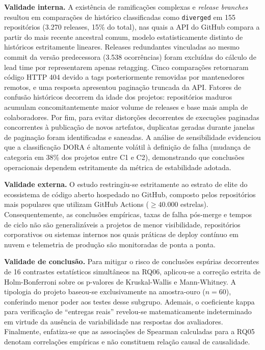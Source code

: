 \documentclass[12pt]{article}
\begin{document}
\textbf{Validade interna.} A existência de ramificações complexas e \textit{release branches} resultou em comparações de histórico classificadas como \texttt{diverged} em 155 repositórios (3.270 releases, 15\% do total), nas quais a API do GitHub compara a partir do mais recente ancestral comum, modelo estatisticamente distinto de históricos estritamente lineares. Releases redundantes vinculadas ao mesmo commit da versão predecessora (3.538 ocorrências) foram excluídas do cálculo de lead time por representarem apenas retagging. Cinco comparações retornaram código HTTP 404 devido a tags posteriormente removidas por mantenedores remotos, e uma resposta apresentou paginação truncada da API. Fatores de confusão históricos decorrem da idade dos projetos: repositórios maduros acumulam concomitantemente maior volume de releases e base mais ampla de colaboradores. Por fim, para evitar distorções decorrentes de execuções paginadas concorrentes à publicação de novos artefatos, duplicatas geradas durante janelas de paginação foram identificadas e saneadas. A análise de sensibilidade evidenciou que a classificação DORA é altamente volátil à definição de falha (mudança de categoria em 38\% dos projetos entre C1 e C2), demonstrando que conclusões operacionais dependem estritamente da métrica de estabilidade adotada.

\textbf{Validade externa.} O estudo restringiu-se estritamente ao estrato de elite do ecossistema de código aberto hospedado no GitHub, composto pelos repositórios mais populares que utilizam GitHub Actions ($\ge 40.000$ estrelas). Consequentemente, as conclusões empíricas, taxas de falha pós-merge e tempos de ciclo não são generalizáveis a projetos de menor visibilidade, repositórios corporativos ou sistemas internos nos quais práticas de deploy contínuo em nuvem e telemetria de produção são monitoradas de ponta a ponta.

\textbf{Validade de conclusão.} Para mitigar o risco de conclusões espúrias decorrentes de 16 contrastes estatísticos simultâneos na RQ06, aplicou-se a correção estrita de Holm-Bonferroni sobre os p-valores de Kruskal-Wallis e Mann-Whitney. A tipologia do projeto baseou-se exclusivamente na amostra-ouro ($n = 60$), conferindo menor poder aos testes desse subgrupo. Ademais, o coeficiente kappa para verificação de ``entregas reais'' revelou-se matematicamente indeterminado em virtude da ausência de variabilidade nas respostas dos avaliadores. Finalmente, enfatiza-se que as associações de Spearman calculadas para a RQ05 denotam correlações empíricas e não constituem relação causal de causalidade.
\end{document}
